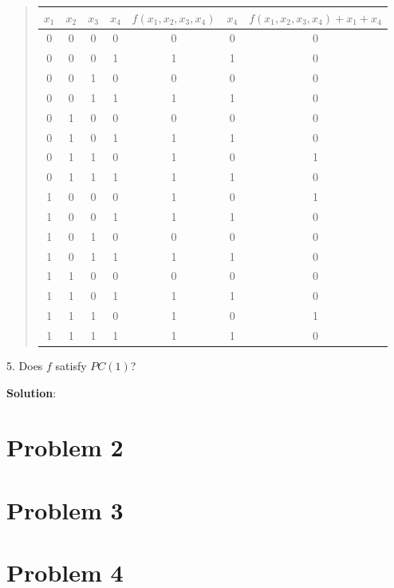 \documentclass[12pt]{article}
\theoremstyle{plain}
\begin{document}
\begin{quote}
\begin{tabular}{c c c c| c || c || c }
$x_1$ & $x_2$ & $x_3$ & $x_4$ & $f(x_1, x_2, x_3, x_4)$ & $x_4$ & $f(x_1, x_2, x_3, x_4)+x_1+x_4$ \\
\hline
0 & 0 & 0 & 0 & 0 & 0 &	0\\
0 & 0 & 0 & 1 & 1 & 1 &	0\\
0 & 0 & 1 & 0 & 0 & 0 & 0\\
0 & 0 & 1 & 1 & 1 & 1	&	0\\
0 & 1 & 0 & 0 & 0 & 0	&	0\\
0 & 1 & 0 & 1 & 1 & 1	&	0\\
0 & 1 & 1 & 0 & 1 & 0	& 1\\
0 & 1 & 1 & 1 & 1 & 1	&	0\\
1 & 0 & 0 & 0 & 1 & 0	&	1\\
1 & 0 & 0 & 1 & 1 & 1	&	0\\
1 & 0 & 1 & 0 & 0 & 0	&	0\\
1 & 0 & 1 & 1 & 1 & 1	&	0\\
1 & 1 & 0 & 0 & 0 & 0	&	0\\
1 & 1 & 0 & 1 & 1 & 1	&	0\\
1 & 1 & 1 & 0 & 1 & 0	&	1\\
1 & 1 & 1 & 1 & 1 & 1	&	0\\
\end{tabular}
\end{quote}

5. Does $f$ satisfy $PC(1)$?

{\bf Solution}: 

\section{Problem 2}

\section{Problem 3}

\section{Problem 4}
\end{document}
